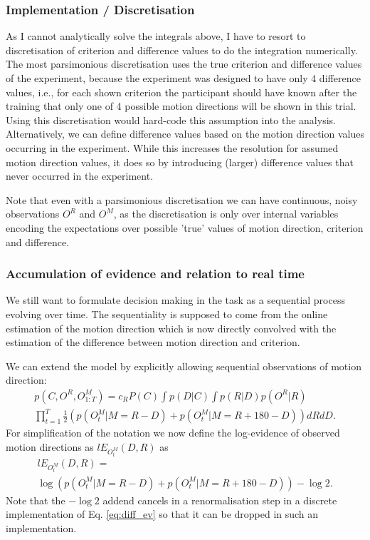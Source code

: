\documentclass[10pt,a4paper]{article}
\begin{document}
\subsubsection{Implementation / Discretisation}
As I cannot analytically solve the integrals above, I have to resort to discretisation of criterion and difference values to do the integration numerically. The most parsimonious discretisation uses the true criterion and difference values of the experiment, because the experiment was designed to have only 4 difference values, i.e., for each shown criterion the participant should have known after the training that only one of 4 possible motion directions will be shown in this trial. Using this discretisation would hard-code this assumption into the analysis. Alternatively, we can define difference values based on the motion direction values occurring in the experiment. While this increases the resolution for assumed motion direction values, it does so by introducing (larger) difference values that never occurred in the experiment.

Note that even with a parsimonious discretisation we can have continuous, noisy observations $O^R$ and $O^M$, as the discretisation is only over internal variables encoding the expectations over possible 'true' values of motion direction, criterion and difference.

\subsubsection{Accumulation of evidence and relation to real time}
We still want to formulate decision making in the task as a sequential process evolving over time. The sequentiality is supposed to come from the online estimation of the motion direction which is now directly convolved with the estimation of the difference between motion direction and criterion.

We can extend the model by explicitly allowing sequential observations of motion direction:
\begin{multline}
p(C, O^R, O^M_{1:T}) = c_R P(C) \int p(D | C) \int p(R | D)p(O^R | R)\\ \prod_{t=1}^T \frac{1}{2}\left( p(O^M_t | M = R - D) + p(O^M_t | M = R + 180 - D) \right) dR dD.
\end{multline}
For simplification of the notation we now define the log-evidence of observed motion directions as $lE_{O^M_t}(D, R)$ as
\begin{multline}
lE_{O^M_t}(D, R) = \\ \log \left(p(O^M_t | M = R - D) + p(O^M_t | M = R + 180 - D) \right) - \log 2.
\end{multline}
Note that the $-\log 2$ addend cancels in a renormalisation step in a discrete implementation of Eq. \eqref{eq:diff_ev} so that it can be dropped in such an implementation.
\end{document}
